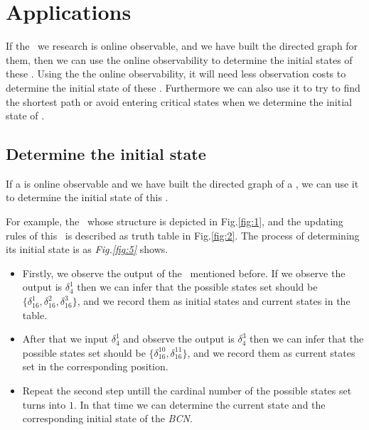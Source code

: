 \section{Applications}
\label{sec:app}
If the \BCNs\ we research is online observable, and we have built the directed graph for them, then we can use the online observability to determine the initial states of these \BCNs. Using the the online observability, it will need less observation costs to determine the initial state of these \BCNs. Furthermore we can also use it to try to find the shortest path or avoid entering critical states when we determine the initial state of \BCNs. %

\subsection{Determine the initial state}

If a \BCN is online observable and we have built the directed graph of a \BCN, we can use it to determine the initial state of this \BCN.
\begin{example}
For example, the \BCN\ whose structure is depicted in Fig.\ref{fig:1}, and the updating rules of this \BCN\ is described as truth table in Fig.\ref{fig:2}. The process of determining its initial state is as {\em Fig.\ref{fig:5}} shows. 
\begin{itemize}
  \item Firstly, we observe the output of the \BCN\ mentioned before. If we observe the output is $\delta_4^1$ then we can infer that the possible states set should be $\{\delta_{16}^1,\delta_{16}^2,\delta_{16}^3\}$, and we record them as initial states and current states in the table. 
  \item After that we input  $\delta_4^1$ and observe the output is $\delta_4^3$ then we can infer that the possible states set should be $\{\delta_{16}^{10},\delta_{16}^{11}\}$, and we record them as current states set in the corresponding position. 
 \item Repeat the second step untill the cardinal number of the possible states set turns into $1$. In that time we can determine the current state and the corresponding initial state of the {\em BCN}.
\end{itemize} 
\end{example}   


